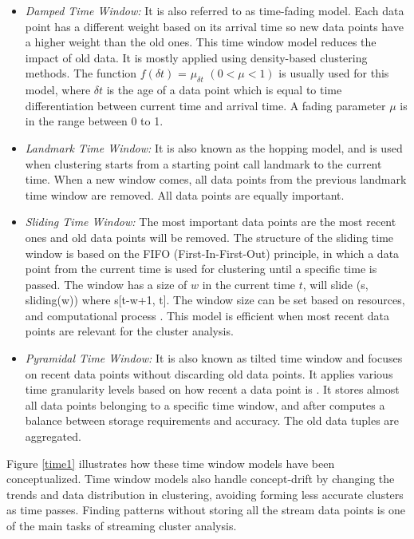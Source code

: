 \begin{itemize}

    \item\textit{Damped Time Window:} It is also referred to as time-fading model. Each data point has a different weight based on its arrival time so new data points have a higher weight than the old ones. This time window model reduces the impact of old data. It is mostly applied using density-based clustering methods. The function $f(\delta t)$ = $\mu_{\delta t}$ $(0 < \mu < 1)$ is usually used for this model, where $\delta t$ is the age of a data point which is equal to time differentiation between current time and arrival time. A fading parameter $\mu$ is in the range between 0 to 1. 
    
    
    \item\textit{Landmark Time Window:} It is also known as the hopping model, and is used when clustering starts from a starting point call landmark to the current time. When a new window comes, all data points from the previous landmark time window are removed. All data points are equally important.

    \item\textit{Sliding Time Window: } The most important data points are the most recent ones and old data points will be removed. The structure of the sliding time window is based on the FIFO (First-In-First-Out) principle, in which a data point from the current time is used for clustering until a specific time is passed. The window has a size of $w$ in the current time $t$, will slide (s, sliding(w)) where s[t-w+1, t].
    The window size can be set based on resources, and computational process \cite{silva2013data}. This model is efficient when most recent data points are relevant for the cluster analysis.  
    
    \item\textit{Pyramidal Time Window: } It is also known as tilted time window and focuses on recent data points without discarding old data points. It applies various time granularity levels based on how recent a data point is \cite{aggarwal2003framework, nguyen2015survey}. It stores almost all data points belonging to a specific time window, and after computes a balance between storage requirements and accuracy. The old data tuples are aggregated. %
    
\end{itemize}    

Figure   \ref{time1} illustrates how these time window models have been conceptualized. Time window models also handle concept-drift by changing the trends and data distribution in clustering, avoiding forming less accurate clusters as time passes. Finding patterns without storing all the stream data points is one of the main tasks of streaming cluster analysis.

